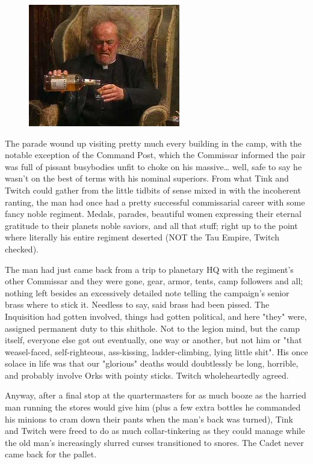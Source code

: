 \begin{figure}
	\begin{center}
		\includegraphics[width=\figwidth]{pics/21/23.png}
	\end{center}
\end{figure}
The parade wound up visiting pretty much every building in the camp, with the notable exception of the Command Post, which the Commissar informed the pair was full of pissant busybodies unfit to choke on his massive… well, safe to say he wasn't on the best of terms with his nominal superiors. 
From what Tink and Twitch could gather from the little tidbits of sense mixed in with the incoherent ranting, the man had once had a pretty successful commissarial career with some fancy noble regiment. 
Medals, parades, beautiful women expressing their eternal gratitude to their planets noble saviors, and all that stuff; 
right up to the point where literally his entire regiment deserted (NOT the Tau Empire, Twitch checked). 


The man had just came back from a trip to planetary HQ with the regiment's other Commissar and they were gone, gear, armor, tents, camp followers and all; 
nothing left besides an excessively detailed note telling the campaign's senior brass where to stick it. 
Needless to say, said brass had been pissed. 
The Inquisition had gotten involved, things had gotten political, and here "they" were, assigned permanent duty to this shithole. 
Not to the legion mind, but the camp itself, everyone else got out eventually, one way or another, but not him or "that weasel-faced, self-righteous, ass-kissing, ladder-climbing, lying little shit". 
His once solace in life was that our "glorious" deaths would doubtlessly be long, horrible, and probably involve Orks with pointy sticks. 
Twitch wholeheartedly agreed.

Anyway, after a final stop at the quartermasters for as much booze as the harried man running the stores would give him (plus a few extra bottles he commanded his minions to cram down their pants when the man's back was turned), Tink and Twitch were freed to do as much collar-tinkering as they could manage while the old man's increasingly slurred curses transitioned to snores. 
The Cadet never came back for the pallet.

